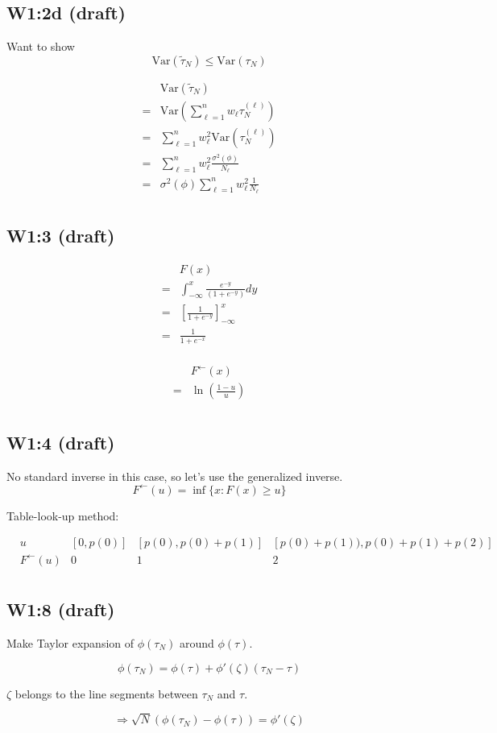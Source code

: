 \documentclass{article}
\begin{document}
\subsection{W1:2d (draft)}

Want to show
\[\text{Var}(\tilde{\tau}_N) \leq \text{Var}(\tau_N)\]

\begin{align*}
   & \text{Var}(\tilde\tau_N) \\
   =& \text{Var}\left(\sum_{\ell=1}^n w_\ell \tau_N^{(\ell)}\right) \\
   =& \sum_{\ell=1}^n w_\ell^2 \text{Var}(\tau_N^{(\ell)}) \\
   =& \sum_{\ell=1}^n w_\ell^2 \frac{\sigma^2(\phi)}{N_\ell} \\
   =& \sigma^2(\phi)\sum_{\ell=1}^n w_\ell^2 \frac{1}{N_\ell} \\
\end{align*}


\subsection{W1:3 (draft)}

\begin{align*}
   & F(x) \\
   =& \int_{-\infty}^x \frac{e^{-y}}{(1+e^{-y})}dy \\
   =& \left[\frac{1}{1+e^{-y}}\right]_{-\infty}^x \\
   =& \frac{1}{1+e^{-x}} \\
\end{align*}

\begin{align*}
   & F^{\leftarrow}(x) \\
   =& \ln(\frac{1-u}{u}) \\
\end{align*}

\subsection{W1:4 (draft)}

No standard inverse in this case, so let's use the generalized inverse.
\[F^{\leftarrow}(u) = \inf \{x:F(x) \geq u\}\]

Table-look-up method:

\begin{align*}
   & u & [0,p(0)] & [p(0),p(0)+p(1)] & [p(0)+p(1)), p(0)+p(1)+p(2)] \\
   & F^{\leftarrow}(u) & 0 & 1 & 2 \\
\end{align*}


\subsection{W1:8 (draft)}

Make Taylor expansion of \(\phi(\tau_N)\) around \(\phi(\tau)\).

\[\phi(\tau_N) = \phi(\tau) + \phi'(\zeta)(\tau_N - \tau)\]

\(\zeta\) belongs to the line segments between \(\tau_N\) and \(\tau\).

\[\Rightarrow \sqrt{N}(\phi(\tau_N) - \phi(\tau)) = \phi'(\zeta)\]
\end{document}

